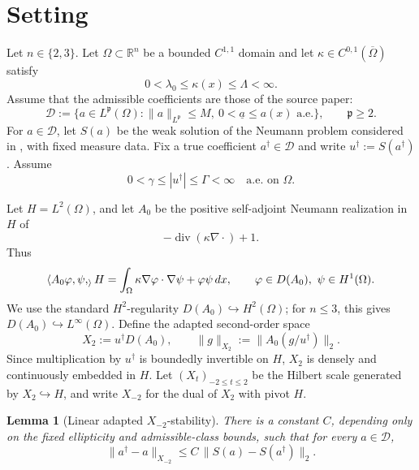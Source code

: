 \documentclass[11pt]{article}
\newtheorem{lemma}{Lemma}
\newcommand{\R}{\mathbb R}
\newcommand{\ip}[2]{\langle #1,#2\rangle}
\newcommand{\fp}{\mathfrak p}
\begin{document}
\section*{Setting}

Let \(n\in\{2,3\}\). Let \(\Omega\subset\R^n\) be a bounded \(C^{1,1}\) domain
and let \(\kappa\in C^{0,1}(\overline\Omega)\) satisfy
\[
  0<\lambda_0\leq \kappa(x)\leq \Lambda<\infty .
\]
Assume that the admissible coefficients are those of the source paper:
\[
  \mathcal D
  :=\{a\in L^\fp(\Omega): \|a\|_{L^\fp}\leq M,\ 
       0<\underline a\leq a(x)\text{ a.e.}\},
  \qquad \fp\geq2 .
\]
For \(a\in\mathcal D\), let \(S(a)\) be the weak solution of the Neumann
problem considered in \cite[Section 4]{ChenYousept2020}, with fixed measure
data. Fix a true coefficient \(a^\dagger\in\mathcal D\) and write
\(u^\dagger:=S(a^\dagger)\). Assume
\[
  0<\gamma\leq |u^\dagger|\leq \Gamma<\infty
  \quad\text{a.e. on }\Omega .
\]

Let \(H=L^2(\Omega)\), and let \(A_0\) be the positive self-adjoint Neumann
realization in \(H\) of
\[
  -\operatorname{div}(\kappa\nabla\cdot)+1 .
\]
Thus
\[
  \ip{A_0\varphi,\psi}_H
  =\int_\Omega \kappa\nabla\varphi\cdot\nabla\psi+\varphi\psi\,dx,
  \qquad \varphi\in D(A_0),\ \psi\in H^1(\Omega).
\]
We use the standard \(H^2\)-regularity \(D(A_0)\hookrightarrow H^2(\Omega)\);
for \(n\le3\), this gives \(D(A_0)\hookrightarrow L^\infty(\Omega)\).
Define the adapted second-order space
\[
  X_2:=u^\dagger D(A_0),\qquad
  \|g\|_{X_2}:=\|A_0(g/u^\dagger)\|_2 .
\]
Since multiplication by \(u^\dagger\) is boundedly invertible on \(H\), \(X_2\)
is densely and continuously embedded in \(H\). Let \((X_t)_{-2\leq t\leq2}\)
be the Hilbert scale generated by \(X_2\hookrightarrow H\), and write
\(X_{-2}\) for the dual of \(X_2\) with pivot \(H\).

\begin{lemma}[Linear adapted \(X_{-2}\)-stability]\label{lem:stability}
There is a constant \(C\), depending only on the fixed ellipticity and
admissible-class bounds, such that for every \(a\in\mathcal D\),
\[
  \|a^\dagger-a\|_{X_{-2}}
  \leq C\,\|S(a)-S(a^\dagger)\|_2 .
\]
\end{lemma}
\end{document}
